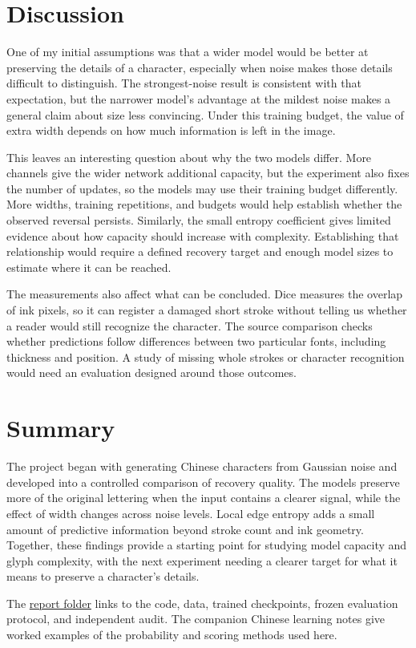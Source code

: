 \documentclass[11pt,letterpaper]{article}
\begin{document}
\section{Discussion}

One of my initial assumptions was that a wider model would be better at preserving the details of a character, especially when noise makes those details difficult to distinguish. The strongest-noise result is consistent with that expectation, but the narrower model's advantage at the mildest noise makes a general claim about size less convincing. Under this training budget, the value of extra width depends on how much information is left in the image.

This leaves an interesting question about why the two models differ. More channels give the wider network additional capacity, but the experiment also fixes the number of updates, so the models may use their training budget differently. More widths, training repetitions, and budgets would help establish whether the observed reversal persists. Similarly, the small entropy coefficient gives limited evidence about how capacity should increase with complexity. Establishing that relationship would require a defined recovery target and enough model sizes to estimate where it can be reached.

The measurements also affect what can be concluded. Dice measures the overlap of ink pixels, so it can register a damaged short stroke without telling us whether a reader would still recognize the character. The source comparison checks whether predictions follow differences between two particular fonts, including thickness and position. A study of missing whole strokes or character recognition would need an evaluation designed around those outcomes.

\section{Summary}

The project began with generating Chinese characters from Gaussian noise and developed into a controlled comparison of recovery quality. The models preserve more of the original lettering when the input contains a clearer signal, while the effect of width changes across noise levels. Local edge entropy adds a small amount of predictive information beyond stroke count and ink geometry. Together, these findings provide a starting point for studying model capacity and glyph complexity, with the next experiment needing a clearer target for what it means to preserve a character's details.

The \href{https://github.com/Rainnnee/zisheng/tree/codex/glyph-entropy-study/report/glyph-entropy}{report folder} links to the code, data, trained checkpoints, frozen evaluation protocol, and independent audit. The companion Chinese learning notes give worked examples of the probability and scoring methods used here.

{\small


}
\end{document}
